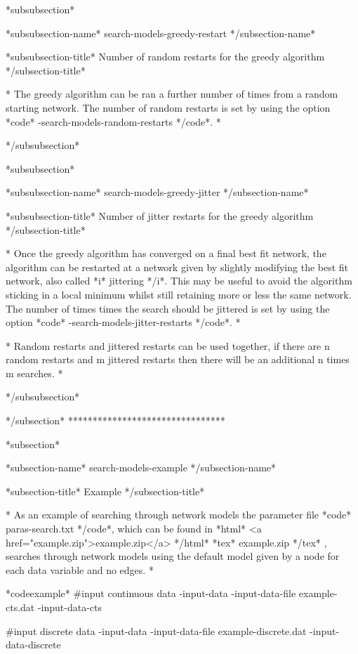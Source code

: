 *subsubsection*

*subsubsection-name* search-models-greedy-restart */subsection-name*

*subsubsection-title* Number of random restarts for the greedy algorithm */subsection-title*

* The greedy algorithm can be ran a further number of times from a random starting network. The number of random restarts is set by using the option *code* -search-models-random-restarts */code*. *

*/subsubsection*


*subsubsection*

*subsubsection-name* search-models-greedy-jitter */subsection-name*

*subsubsection-title* Number of jitter restarts for the greedy algorithm */subsection-title*

* Once the greedy algorithm has converged on a final best fit network, the algorithm can be restarted at a network given by slightly modifying the best fit network, also called *i* jittering */i*. This may be useful to avoid the algorithm sticking in a local minimum whilst still retaining more or less the same network. The number of times times the search should be jittered is set by using the option *code* -search-models-jitter-restarts */code*. *

* Random restarts and jittered restarts can be used together, if there are n random restarts and m jittered restarts then there will be an additional n times m searches. *

*/subsubsection*


*/subsection* ********************************



*subsection*

*subsection-name* search-models-example */subsection-name*

*subsection-title* Example */subsection-title*

* As an example of searching through network models the parameter file *code* paras-search.txt */code*, which can be found in *html* <a href="example.zip">example.zip</a> */html* *tex* example.zip */tex* , searches through network models using the default model given by a node for each data variable and no edges. *

*codeexample* #input continuous data -input-data -input-data-file example-cts.dat -input-data-cts

#input discrete data -input-data -input-data-file example-discrete.dat -input-data-discrete

